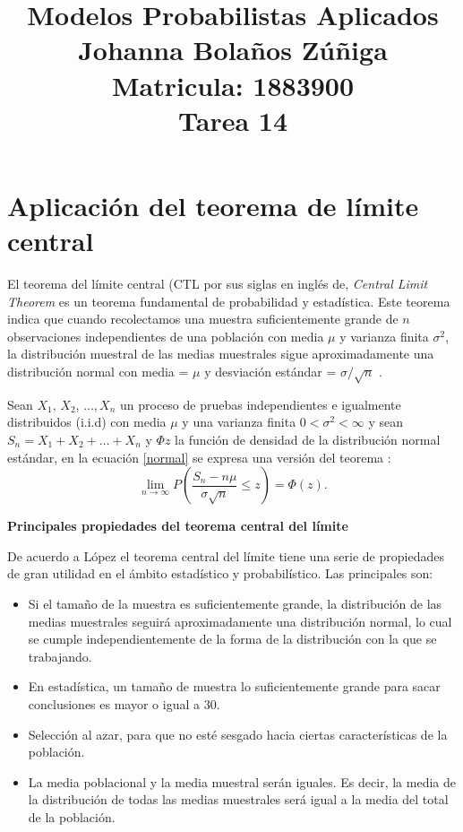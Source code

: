 \documentclass{article}
\title{
\centering
Modelos Probabilistas Aplicados \\
Johanna Bolaños Zúñiga \\
Matricula: 1883900\\
Tarea 14
}
\date{}
\begin{document}
\maketitle

\section{Aplicación del teorema de límite central}

El teorema del límite central (CTL por sus siglas en inglés de, \textit{Central Limit Theorem} es un teorema fundamental de probabilidad y estadística. Este teorema indica que cuando recolectamos una muestra suficientemente grande de $n$ observaciones independientes de una población con media $\mu$ y varianza finita $\sigma^2$, la distribución muestral de las medias muestrales sigue aproximadamente una distribución normal con media = $\mu$ y desviación estándar = $\sigma / \sqrt{n}$ \cite{Bento}. 

Sean $X_{1}, \, X_{2}, \, \dots , X_{n}$ un proceso de pruebas independientes e igualmente distribuidos (i.i.d) con media $\mu$ y una varianza finita $0<\sigma^2 < \infty$ y sean $S_{n} = X_{1} + X_{2} + \dots + X_{n}$ y $\Phi{z}$ la función de densidad de la distribución normal estándar, en la ecuación \ref{normal} se expresa una versión del teorema \cite{Stanton}:
\begin{equation} 
\lim_{n \to \infty}P\left(\frac{S_{n} - n\mu}{\sigma \sqrt{n}} \leq z \right) = \Phi{(z)}.
\label{normal}
\end{equation}

\noindent \textbf{Principales propiedades del teorema central del límite}

De acuerdo a López \cite{Lopez} el teorema central del límite tiene una serie de propiedades de gran utilidad en el ámbito estadístico y probabilístico. Las principales son:

\begin{itemize}
    \item Si el tamaño de la muestra es suficientemente grande, la distribución de las medias muestrales seguirá aproximadamente una distribución normal, lo cual se cumple independientemente de la forma de la distribución con la que se trabajando.
    \item En estadística, un tamaño de muestra lo suficientemente grande para sacar conclusiones es mayor o igual a 30.
    \item Selección al azar, para que no esté sesgado hacia ciertas características de la población.
    \item La media poblacional y la media muestral serán iguales. Es decir, la media de la distribución de todas las medias muestrales será igual a la media del total de la población.
\end{itemize}
\end{document}
